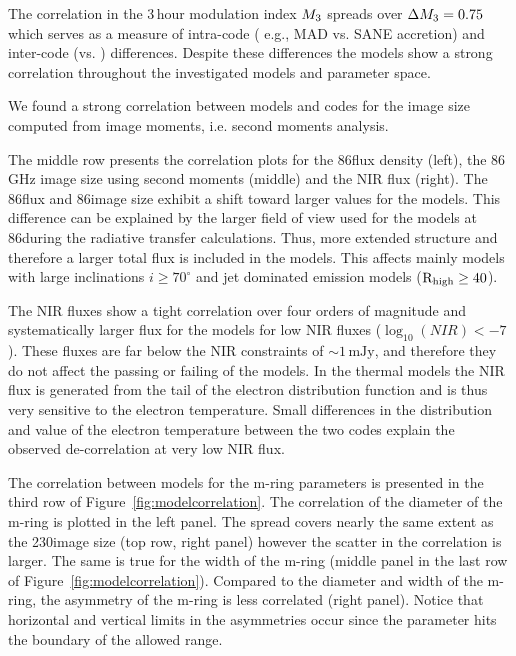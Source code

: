 The correlation in the 3\,hour modulation index $M_{3}$ spreads over $\Delta M_{3}=0.75$ which serves as a measure of intra-code ( e.g., MAD vs. SANE accretion) and inter-code (\bhac vs. \kharma) differences. Despite these differences the models show a strong correlation throughout the investigated models and parameter space.

We found a strong correlation between models and codes for the image size computed from image moments, i.e. second moments analysis.

The middle row presents the correlation plots for the 86\GHz flux density (left), the 86\,GHz image size using second moments (middle) and the NIR flux (right). The 86\GHz flux and 86\GHz image size exhibit a shift toward larger values for the \bhac models. This difference can be explained by the larger field of view used for the \bhac models at 86\GHz during the radiative transfer calculations. Thus, more extended structure and therefore a larger total flux is included in the \bhac models. This affects mainly models with large inclinations $i\geq70^\circ$ and jet dominated emission models ($\rm{R}_{\rm high}\geq 40$).

The NIR fluxes show a tight correlation over four orders of magnitude and systematically larger flux for the \bhac models for low NIR fluxes ($\log_{10}(NIR) < -7$). These fluxes are far below the NIR constraints of $\sim 1\,\mathrm{mJy}$, and therefore they do not affect the passing or failing of the models. In the thermal models the NIR flux is generated from the tail of the electron distribution function and is thus very sensitive to the electron temperature. Small differences in the distribution and value of the electron temperature between the two codes explain the observed de-correlation at very low NIR flux.

The correlation between models for the m-ring parameters is presented in the third row of Figure~\ref{fig:modelcorrelation}. The correlation of the diameter of the m-ring is plotted in the left panel. The spread covers nearly the same extent as the 230\GHz image size (top row, right panel) however the scatter in the correlation is larger.  The same is true for the width of the m-ring (middle panel in the last row of Figure~\ref{fig:modelcorrelation}). Compared to the diameter and width of the m-ring, the asymmetry of the m-ring is less correlated (right panel). Notice that horizontal and vertical limits in the asymmetries occur since the parameter hits the boundary of the allowed range.

